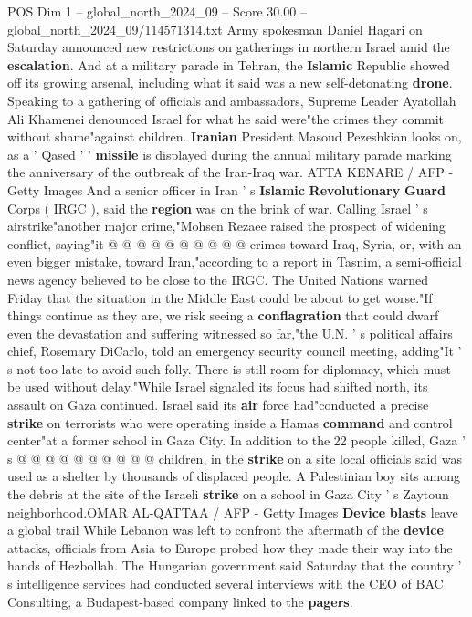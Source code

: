 \begin{textsample}{POS Dim 1 – global\_north\_2024\_09 – Score 30.00 – global\_north\_2024\_09/114571314.txt}
Army spokesman Daniel Hagari on Saturday announced new restrictions on gatherings in northern Israel amid the \textbf{escalation}.
And at a military parade in Tehran, the \textbf{Islamic} Republic showed off its growing arsenal, including what it said was a new self-detonating \textbf{drone}.
Speaking to a gathering of officials and ambassadors, Supreme Leader Ayatollah Ali Khamenei denounced Israel for what he said were"the crimes they commit without shame"against children. \textbf{Iranian} President Masoud Pezeshkian looks on, as a ' Qased ' ' \textbf{missile} is displayed during the annual military parade marking the anniversary of the outbreak of the Iran-Iraq war.
ATTA KENARE / AFP - Getty Images And a senior officer in Iran ' s \textbf{Islamic} \textbf{Revolutionary} \textbf{Guard} Corps ( IRGC ), said the \textbf{region} was on the brink of war.
Calling Israel ' s airstrike"another major crime,"Mohsen Rezaee raised the prospect of widening conflict, saying"it @ @ @ @ @ @ @ @ @ @ crimes toward Iraq, Syria, or, with an even bigger mistake, toward Iran,"according to a report in Tasnim, a semi-official news agency believed to be close to the IRGC.
The United Nations warned Friday that the situation in the Middle East could be about to get worse."If things continue as they are, we risk seeing a \textbf{conflagration} that could dwarf even the devastation and suffering witnessed so far,"the U.N. ' s political affairs chief, Rosemary DiCarlo, told an emergency security council meeting, adding"It ' s not too late to avoid such folly.
There is still room for diplomacy, which must be used without delay."While Israel signaled its focus had shifted north, its assault on Gaza continued.
Israel said its \textbf{air} force had"conducted a precise \textbf{strike} on terrorists who were operating inside a Hamas \textbf{command} and control center"at a former school in Gaza City.
In addition to the 22 people killed, Gaza ' s @ @ @ @ @ @ @ @ @ @ children, in the \textbf{strike} on a site local officials said was used as a shelter by thousands of displaced people.
A Palestinian boy sits among the debris at the site of the Israeli \textbf{strike} on a school in Gaza City ' s Zaytoun neighborhood.OMAR AL-QATTAA / AFP - Getty Images \textbf{Device} \textbf{blasts} leave a global trail While Lebanon was left to confront the aftermath of the \textbf{device} attacks, officials from Asia to Europe probed how they made their way into the hands of Hezbollah.
The Hungarian government said Saturday that the country ' s intelligence services had conducted several interviews with the CEO of BAC Consulting, a Budapest-based company linked to the \textbf{pagers}.

\end{textsample}
